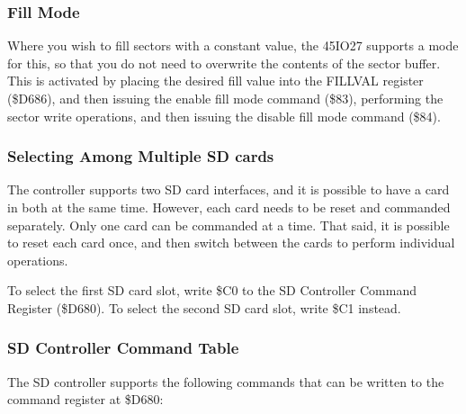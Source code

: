 \subsubsection{Fill Mode}

Where you wish to fill sectors with a constant value, the 45IO27
supports a mode for this, so that you do not need to overwrite the
contents of the sector buffer. This is activated by placing the
desired fill value into the FILLVAL register (\$D686), and then
issuing the enable fill mode command (\$83), performing the sector
write operations, and then issuing the disable fill mode command
(\$84). 

\subsubsection{Selecting Among Multiple SD cards}

The controller supports two SD card interfaces, and it is possible to
have a card in both at the same time.  However, each card needs to be
reset and commanded separately.  Only one card can be commanded at a
time.  That said, it is possible to reset each card once, and then
switch between the cards to perform individual operations.

To select the first SD card slot, write \$C0 to the SD Controller
Command Register (\$D680).  To select the second SD card slot, write
\$C1 instead.

\subsubsection{SD Controller Command Table}

The SD controller supports the following commands that can be written
to the command register at \$D680:

